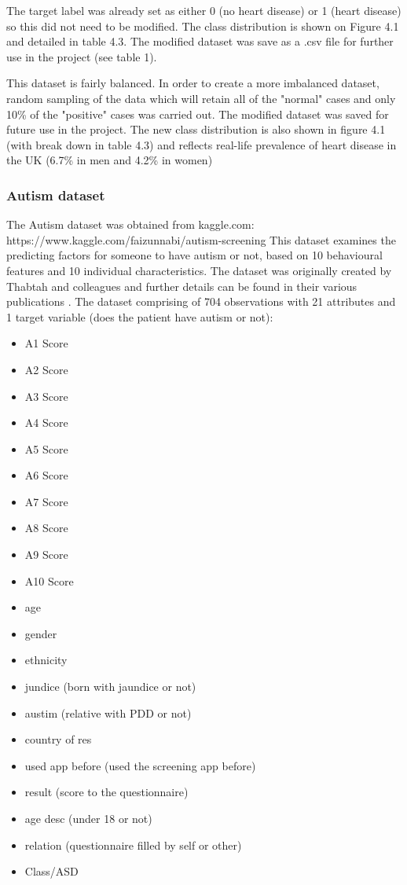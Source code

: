 The target label was already set as either 0 (no heart disease) or 1 (heart disease) so this did not need to be modified. 
The class distribution is shown on Figure 4.1 and detailed in table 4.3. The modified dataset was save as a .csv file for further use in the project (see table 1).

This dataset is fairly balanced. In order to create a more imbalanced dataset, random sampling of the data which will retain all of the "normal" cases and only 10\% of the "positive" cases was carried out. The modified dataset was saved for future use in the project. The new class distribution is also shown in figure 4.1 (with break down in table 4.3) and reflects real-life prevalence of heart disease in the UK (6.7\% in men and 4.2\% in women) \citep{}\newline

\subsubsection{Autism dataset}
The Autism dataset was obtained from kaggle.com:\newline
https://www.kaggle.com/faizunnabi/autism-screening\newline
This dataset examines the predicting factors for someone to have autism or not, based on 10 behavioural features and 10 individual characteristics. The dataset was originally created by Thabtah and colleagues \citep{} and further details can be found in their various publications \cite{}.\newline
The dataset comprising of 704 observations with 21 attributes and 1 target variable (does the patient have autism or not):\newline
\begin{itemize}
    \item A1 Score 
    \item A2 Score
    \item A3 Score 
    \item A4 Score
    \item A5 Score
    \item A6 Score
    \item A7 Score
    \item A8 Score
    \item A9 Score
    \item A10 Score
    \item age
    \item gender
    \item ethnicity 
    \item jundice (born with jaundice or not)
    \item austim (relative with PDD or not)
    \item country of res
    \item used app before (used the screening app before)
    \item result (score to the questionnaire)
    \item age desc (under 18 or not)
    \item relation (questionnaire filled by self or other)
    \item Class/ASD
\end{itemize}

